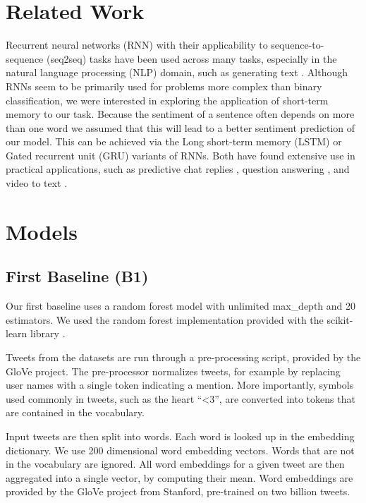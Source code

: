 \documentclass[10pt,conference,compsocconf]{IEEEtran}
\begin{document}
\section{Related Work}

Recurrent neural networks (RNN) with their applicability to
sequence-to-sequence (seq2seq) tasks have been used across many tasks,
especially in the natural language processing (NLP) domain, such as generating text \cite{Sutskever}.
Although RNNs seem to be primarily used for problems more
complex than binary classification, we were interested in exploring
the application of short-term memory to our task. 
Because the sentiment of a sentence often depends on more than one word 
we assumed that this will lead to a better sentiment prediction of our model.
This can be achieved via the Long short-term memory (LSTM) or 
Gated recurrent unit (GRU) variants of RNNs. Both have found extensive use in practical
applications, such as predictive chat replies \cite{allo},
question answering \cite{DiWang}, and video to text \cite{DBLP}.

\section{Models}

\subsection{First Baseline (B1)} \label{subsec:b1}

Our first baseline uses a random forest model with unlimited
max\_depth and 20 estimators. We used the random forest implementation
provided with the scikit-learn library \cite{scikit-learn}.

Tweets from the datasets are run through a pre-processing script,
provided by the GloVe project. The pre-processor normalizes tweets,
for example by replacing user names with a single token indicating a
mention. More importantly, symbols used commonly in tweets, such as
the heart ``\textless3'', are converted into tokens that are contained in the
vocabulary.

Input tweets are then split into words. Each word is looked up in the
embedding dictionary. We use 200 dimensional word embedding vectors. Words that
are not in the vocabulary are ignored. All word embeddings for a given
tweet are then aggregated into a single vector, by computing their
mean. Word embeddings are provided by the GloVe \cite{glove} project
from Stanford, pre-trained on two billion tweets.
\end{document}
